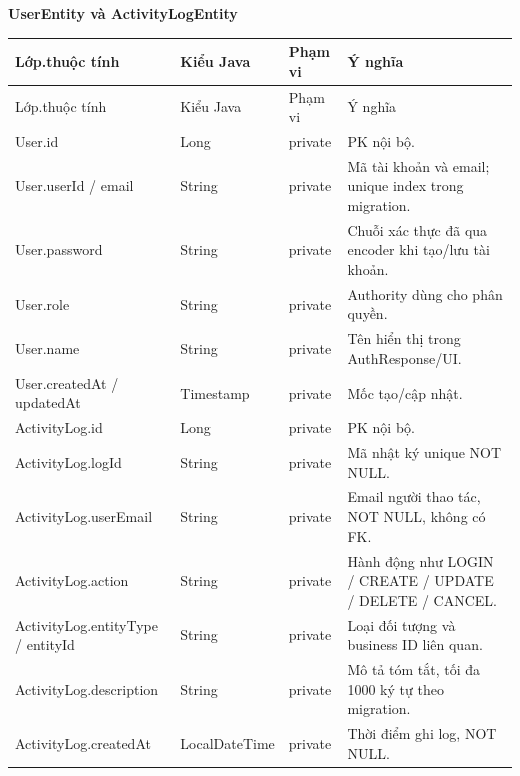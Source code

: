 \documentclass[12pt,a4paper,oneside]{report}
\newcommand{\ClassTableTitle}[1]{\par\medskip\noindent\textbf{#1}\par\smallskip}
\begin{document}
\ClassTableTitle{UserEntity và ActivityLogEntity}
\small\begin{longtable}{@{}D{3.25cm}D{3.35cm}D{1.35cm}D{6.75cm}@{}}\toprule Lớp.thuộc tính & Kiểu Java & Phạm vi & Ý nghĩa\\\midrule\endfirsthead\toprule Lớp.thuộc tính & Kiểu Java & Phạm vi & Ý nghĩa\\\midrule\endhead\bottomrule\endfoot
User.\allowbreak id & Long & private & PK nội bộ.\\User.\allowbreak userId / email & String & private & Mã tài khoản và email; unique index trong migration.\\User.\allowbreak password & String & private & Chuỗi xác thực đã qua encoder khi tạo/lưu tài khoản.\\User.\allowbreak role & String & private & Authority dùng cho phân quyền.\\User.\allowbreak name & String & private & Tên hiển thị trong AuthResponse/UI.\\User.\allowbreak createdAt / updatedAt & Timestamp & private & Mốc tạo/cập nhật.\\ActivityLog.\allowbreak id & Long & private & PK nội bộ.\\ActivityLog.\allowbreak logId & String & private & Mã nhật ký unique NOT NULL.\\ActivityLog.\allowbreak userEmail & String & private & Email người thao tác, NOT NULL, không có FK.\\ActivityLog.\allowbreak action & String & private & Hành động như LOGIN / CREATE / UPDATE / DELETE / CANCEL.\\ActivityLog.\allowbreak entityType / entityId & String & private & Loại đối tượng và business ID liên quan.\\ActivityLog.\allowbreak description & String & private & Mô tả tóm tắt, tối đa 1000 ký tự theo migration.\\ActivityLog.\allowbreak createdAt & LocalDateTime & private & Thời điểm ghi log, NOT NULL.\\\end{longtable}\normalsize
\end{document}
